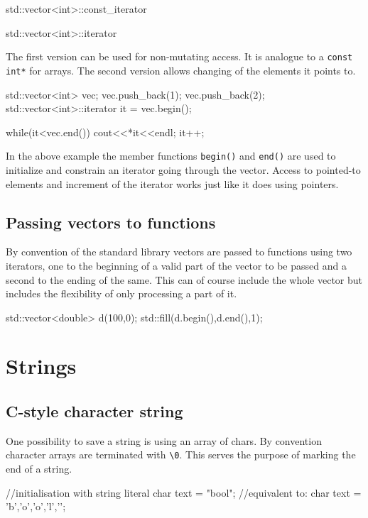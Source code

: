 \documentclass[10pt,a4paper]{scrartcl}
\begin{document}
\begin{multicols*}{2}
\begin{TPCpp}
std::vector<int>::const_iterator

std::vector<int>::iterator
\end{TPCpp}

The first version can be used for non-mutating access. It is analogue to a \verb+const int*+ for arrays. The second version allows changing of the elements it points to. 

\begin{TPCpp}
std::vector<int> vec;
vec.push_back(1);
vec.push_back(2);
std::vector<int>::iterator it = vec.begin();

while(it<vec.end()) {
	cout<<*it<<endl;
	it++;
}
\end{TPCpp}

In the above example the member functions \verb+begin()+ and \verb+end()+ are used to initialize and constrain an iterator going through the vector. Access to pointed-to elements and increment of the iterator works just like it does using pointers.

\subsection{Passing vectors to functions}

By convention of the standard library vectors are passed to functions using two iterators, one to the beginning of a valid part of the vector to be passed and  a second to the ending of the same. This can of course include the whole vector but includes the flexibility of only processing a part of it.

\begin{TPCpp}
std::vector<double> d(100,0);
std::fill(d.begin(),d.end(),1);
\end{TPCpp}

\section{Strings}

\subsection{C-style character string}

One possibility to save a string is using an array of chars. By convention character arrays are terminated with \verb+\0+. This serves the purpose of marking the end of a string.

\begin{TPCpp}
//initialisation with string literal
char text = "bool";
//equivalent to:
char text = {'b','o','o','l','\0'};
\end{TPCpp}


\end{multicols*}
\end{document}
